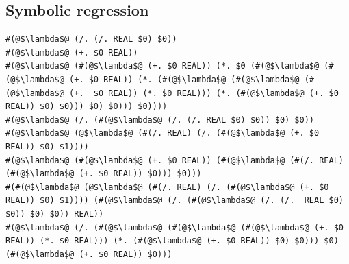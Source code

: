 \documentclass{article}
\begin{document}
\subsection{Symbolic regression}
\begin{lstlisting}
#(@$\lambda$@ (/. (/. REAL $0) $0))
#(@$\lambda$@ (+. $0 REAL))
#(@$\lambda$@ (#(@$\lambda$@ (+. $0 REAL)) (*. $0 (#(@$\lambda$@ (#(@$\lambda$@ (+. $0 REAL)) (*. (#(@$\lambda$@ (#(@$\lambda$@ (#(@$\lambda$@ (+.  $0 REAL)) (*. $0 REAL))) (*. (#(@$\lambda$@ (+. $0 REAL)) $0) $0))) $0) $0))) $0))))
#(@$\lambda$@ (/. (#(@$\lambda$@ (/. (/. REAL $0) $0)) $0) $0))
#(@$\lambda$@ (@$\lambda$@ (#(/. REAL) (/. (#(@$\lambda$@ (+. $0 REAL)) $0) $1))))
#(@$\lambda$@ (#(@$\lambda$@ (+. $0 REAL)) (#(@$\lambda$@ (#(/. REAL) (#(@$\lambda$@ (+. $0 REAL)) $0))) $0)))
#(#(@$\lambda$@ (@$\lambda$@ (#(/. REAL) (/. (#(@$\lambda$@ (+. $0 REAL)) $0) $1)))) (#(@$\lambda$@ (/. (#(@$\lambda$@ (/. (/.  REAL $0) $0)) $0) $0)) REAL))
#(@$\lambda$@ (/. (#(@$\lambda$@ (#(@$\lambda$@ (#(@$\lambda$@ (+. $0 REAL)) (*. $0 REAL))) (*. (#(@$\lambda$@ (+. $0 REAL)) $0) $0))) $0) (#(@$\lambda$@ (+. $0 REAL)) $0)))
\end{lstlisting}



\end{document}
